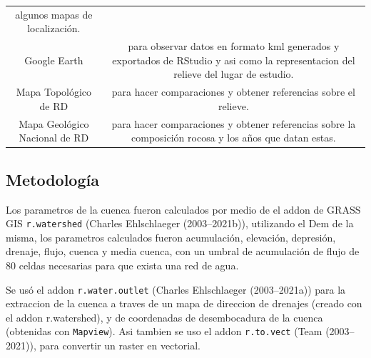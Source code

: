 \documentclass[11pt,]{article}
\begin{document}
\begin{longtable}[]{@{}cc@{}}
\begin{minipage}[t]{0.83\columnwidth}
algunos mapas de localización.\strut
\end{minipage}\tabularnewline
\begin{minipage}[t]{0.11\columnwidth}\centering\strut
Google Earth\strut
\end{minipage} & \begin{minipage}[t]{0.83\columnwidth}\centering\strut
para observar datos en formato kml generados y exportados de RStudio y
asi como la representacion del relieve del lugar de estudio.\strut
\end{minipage}\tabularnewline
\begin{minipage}[t]{0.11\columnwidth}\centering\strut
Mapa Topológico de RD\strut
\end{minipage} & \begin{minipage}[t]{0.83\columnwidth}\centering\strut
para hacer comparaciones y obtener referencias sobre el relieve.\strut
\end{minipage}\tabularnewline
\begin{minipage}[t]{0.11\columnwidth}\centering\strut
Mapa Geológico Nacional de RD\strut
\end{minipage} & \begin{minipage}[t]{0.83\columnwidth}\centering\strut
para hacer comparaciones y obtener referencias sobre la composición
rocosa y los años que datan estas.\strut
\end{minipage}\tabularnewline
\bottomrule
\end{longtable}

\subsection{Metodología}\label{metodologuxeda}

Los parametros de la cuenca fueron calculados por medio de el addon de
GRASS GIS \texttt{r.watershed} (Charles Ehlschlaeger (2003--2021b)),
utilizando el Dem de la misma, los parametros calculados fueron
acumulación, elevación, depresión, drenaje, flujo, cuenca y media
cuenca, con un umbral de acumulación de flujo de 80 celdas necesarias
para que exista una red de agua.

Se usó el addon \texttt{r.water.outlet} (Charles Ehlschlaeger
(2003--2021a)) para la extraccion de la cuenca a traves de un mapa de
direccion de drenajes (creado con el addon r.watershed), y de
coordenadas de desembocadura de la cuenca (obtenidas con
\texttt{Mapview}). Asi tambien se uso el addon \texttt{r.to.vect} (Team
(2003--2021)), para convertir un raster en vectorial.
\end{document}
